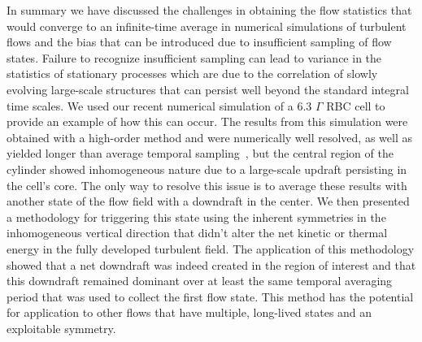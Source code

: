\documentclass[twocolumn,10pt]{tsfp}
\begin{document}
In summary we have discussed the challenges in obtaining the flow statistics that would converge to an infinite-time average in numerical simulations of turbulent flows and the bias that can be introduced due to insufficient sampling of flow states.
Failure to recognize insufficient sampling can lead to variance in the statistics of stationary processes which are due to the correlation of slowly evolving large-scale structures that can persist well beyond the standard integral time scales.  We used our recent numerical simulation of a 6.3 $\Gamma$ RBC cell to provide an example of how this can occur.  The results from this simulation were obtained with a high-order method and were numerically well resolved, as well as yielded longer than average temporal sampling~\cite{sakievich2016large}, but the central region of the cylinder showed inhomogeneous nature due to a large-scale updraft persisting in the cell's core.  The only way to resolve this issue is to average these results with another state of the flow field with a downdraft in the center.  We then presented a methodology for triggering this state using the inherent symmetries in the inhomogeneous vertical direction that didn't alter the net kinetic or thermal energy in the fully developed turbulent field. The application of this methodology showed that a net downdraft was indeed created in the region of interest and that this downdraft remained dominant over at least the same temporal averaging period that was used to collect the first flow state. 
This method has the potential for application to other flows that have multiple, long-lived states and an exploitable symmetry. 
\end{document}
